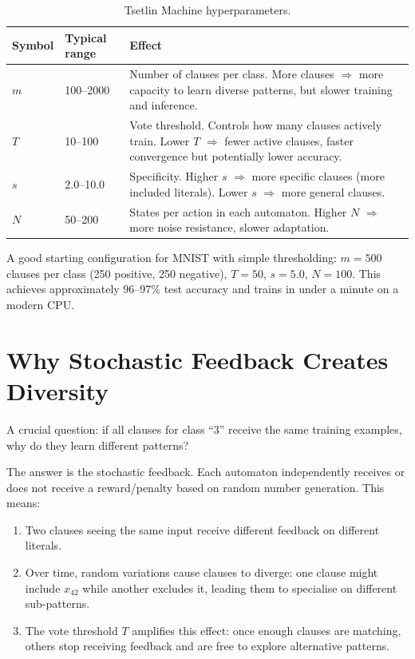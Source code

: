 \begin{table}[htbp]
\centering
\caption{Tsetlin Machine hyperparameters.}
\label{tab:tm-hyperparams}
\begin{tabular}{@{}llp{6cm}@{}}
  \toprule
  \textbf{Symbol} & \textbf{Typical range} & \textbf{Effect} \\
  \midrule
  $m$ & 100--2000 & Number of clauses per class. More clauses
    $\Rightarrow$ more capacity to learn diverse patterns, but
    slower training and inference. \\
  $T$ & 10--100 & Vote threshold. Controls how many clauses
    actively train. Lower $T$ $\Rightarrow$ fewer active clauses,
    faster convergence but potentially lower accuracy. \\
  $s$ & 2.0--10.0 & Specificity. Higher $s$ $\Rightarrow$ more
    specific clauses (more included literals). Lower $s$ $\Rightarrow$
    more general clauses. \\
  $N$ & 50--200 & States per action in each automaton. Higher $N$
    $\Rightarrow$ more noise resistance, slower adaptation. \\
  \bottomrule
\end{tabular}
\end{table}

\begin{engineernote}
A good starting configuration for MNIST with simple thresholding:
$m = 500$ clauses per class (250 positive, 250 negative), $T = 50$,
$s = 5.0$, $N = 100$. This achieves approximately 96--97\% test
accuracy and trains in under a minute on a modern CPU.
\end{engineernote}


\section{Why Stochastic Feedback Creates Diversity}
\label{sec:diversity}

A crucial question: if all clauses for class ``3'' receive the same
training examples, why do they learn different patterns?

The answer is the stochastic feedback. Each automaton independently
receives or does not receive a reward/penalty based on random number
generation. This means:

\begin{enumerate}
  \item Two clauses seeing the same input receive different feedback
    on different literals.
  \item Over time, random variations cause clauses to diverge: one
    clause might include $x_{42}$ while another excludes it, leading
    them to specialise on different sub-patterns.
  \item The vote threshold $T$ amplifies this effect: once enough
    clauses are matching, others stop receiving feedback and are free
    to explore alternative patterns.
\end{enumerate}

